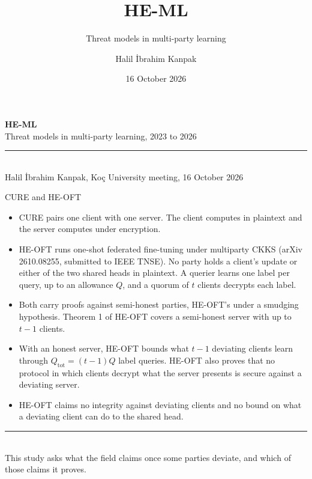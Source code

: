 \documentclass[aspectratio=169,10pt]{beamer}
\title{HE-ML}
\subtitle{Threat models in multi-party learning}
\author{Halil \.{I}brahim Kanpak}
\date{16 October 2026}
\newcommand{\redline}{\textcolor{kred}{\rule{\textwidth}{1pt}}}
\newcommand{\Qtot}{Q_{\mathrm{tot}}}
\begin{document}
\begin{frame}[plain]
  \vfill
  {\Huge\textbf{\textcolor{kred}{HE-ML}}}\\[0.4em]
  {\large Threat models in multi-party learning, 2023 to 2026}\\[1.2em]
  \redline\\[0.8em]
  {\small Halil \.{I}brahim Kanpak, Ko\c{c} University \hfill meeting, 16 October 2026}
  \vfill
\end{frame}

\begin{frame}{CURE and HE-OFT}
  \begin{itemize}
    \item CURE pairs one client with one server. The client computes in plaintext and the server computes under encryption.
    \item HE-OFT runs one-shot federated fine-tuning under multiparty CKKS (arXiv 2610.08255, submitted to IEEE TNSE). No party holds a client's update or either of the two shared heads in plaintext. A querier learns one label per query, up to an allowance $Q$, and a quorum of $t$ clients decrypts each label.
    \item Both carry proofs against semi-honest parties, HE-OFT's under a smudging hypothesis. Theorem 1 of HE-OFT covers a semi-honest server with up to $t-1$ clients.
    \item With an honest server, HE-OFT bounds what $t-1$ deviating clients learn through $\Qtot=(t-1)Q$ label queries. HE-OFT also proves that no protocol in which clients decrypt what the server presents is secure against a deviating server.
    \item HE-OFT claims no integrity against deviating clients and no bound on what a deviating client can do to the shared head.
  \end{itemize}
  \vspace{0.5em}
  \redline\\[0.4em]
  This study asks what the field claims once some parties deviate, and which of those claims it proves.
\end{frame}
\end{document}
